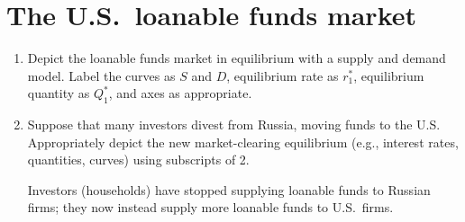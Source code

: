 \documentclass{assignment}
\begin{document}
\section{The U.S.~loanable funds market}

\begin{enumerate}

\item Depict the loanable funds market in equilibrium with a supply and demand model. Label the curves as $S$ and $D$, equilibrium rate as $r^*_1$, equilibrium quantity as $Q^*_1$, and axes as appropriate.

\begin{solution}
\begin{center}
\end{center}
\vspace{-12pt}
\end{solution}

\item Suppose that many investors divest from Russia, moving funds to the U.S. Appropriately depict the new market-clearing equilibrium (e.g., interest rates, quantities, curves) using subscripts of 2.

\begin{solution}
Investors (households) have stopped supplying loanable funds to Russian firms; they now instead supply more loanable funds to U.S.~firms.

\begin{center}
\end{center}
\end{solution}


\end{enumerate}
\end{document}
